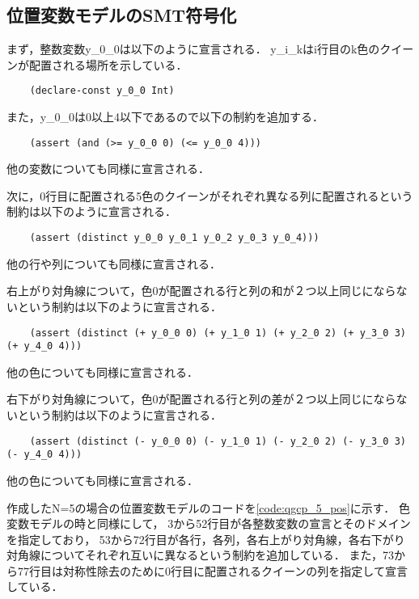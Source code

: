 


\subsection{位置変数モデルのSMT符号化}
まず，整数変数y\_0\_0は以下のように宣言される．
y\_i\_kはi行目のk色のクイーンが配置される場所を示している．
\begin{verbatim}
    (declare-const y_0_0 Int)
\end{verbatim}
また，y\_0\_0は0以上4以下であるので以下の制約を追加する．
\begin{verbatim}
    (assert (and (>= y_0_0 0) (<= y_0_0 4)))
\end{verbatim}
他の変数についても同様に宣言される．

次に，0行目に配置される5色のクイーンがそれぞれ異なる列に配置されるという制約は以下のように宣言される．
\begin{verbatim}
    (assert (distinct y_0_0 y_0_1 y_0_2 y_0_3 y_0_4)))
\end{verbatim}
他の行や列についても同様に宣言される．

右上がり対角線について，色0が配置される行と列の和が２つ以上同じにならないという制約は以下のように宣言される．
\begin{verbatim}
    (assert (distinct (+ y_0_0 0) (+ y_1_0 1) (+ y_2_0 2) (+ y_3_0 3) (+ y_4_0 4)))
\end{verbatim}
他の色についても同様に宣言される．

右下がり対角線について，色0が配置される行と列の差が２つ以上同じにならないという制約は以下のように宣言される．
\begin{verbatim}
    (assert (distinct (- y_0_0 0) (- y_1_0 1) (- y_2_0 2) (- y_3_0 3) (- y_4_0 4)))
\end{verbatim}
他の色についても同様に宣言される．


作成したN=5の場合の位置変数モデルのコードを\ref{code:qgcp_5_pos}に示す．
色変数モデルの時と同様にして，
3から52行目が各整数変数の宣言とそのドメインを指定しており，
53から72行目が各行，各列，各右上がり対角線，各右下がり対角線についてそれぞれ互いに異なるという制約を追加している．
また，73から77行目は対称性除去のために0行目に配置されるクイーンの列を指定して宣言している．

